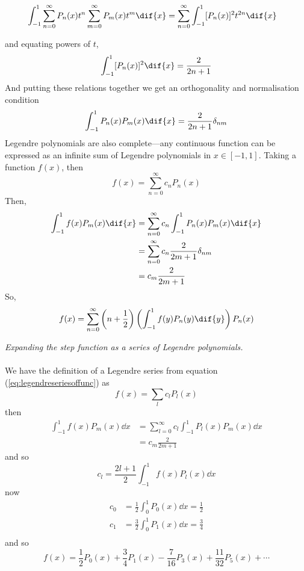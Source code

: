 \begin{align*}
  \int_{-1}^1 \sum_{n=0}^{\infty} P_n(x)t^n \sum_{m=0}^{\infty} P_m(x)
  t^m \dif{x} &= \sum_{n=0}^{\infty} \int_{-1}^1 [P_n(x)]^2 t^{2n}
  \dif{x}
\end{align*}

and equating powers of $t$,
\begin{align*}
  \int_{-1}^1 [P_n(x)]^2 \dif{x} = \frac{2}{2n + 1}
\end{align*}
And putting these relations together we get an orthogonality and
normalisation condition
\begin{equation}
  \label{eq:orthonormlegend}
  \int_{-1}^1 P_n(x) P_m(x) \dif{x} = \frac{2}{2n+1} \delta_{nm}
\end{equation}
Legendre polynomials are also complete---any continuous function can
be expressed as an infinite sum of Legendre polynomials in $x \in
[-1,1]$. Taking a function $f(x)$, then
\begin{equation}
  \label{eq:legendreseries}
  f(x) = \sum_{n=0}^{\infty} c_n P_n(x)
\end{equation}
Then,
\begin{align*}
  \int_{-1}^1 f(x) P_m(x) \dif{x} &= \sum_{n=0}^{\infty} c_n
  \int_{-1}^1 P_n(x) P_m(x) \dif{x} \\ &= \sum_{n=0}^{\infty} c_n
  \frac{2}{2m+1} \delta_{nm} \\ &= c_m \frac{2}{2m+1}
\end{align*}
So,
\begin{equation}
  \label{eq:legendreseriesoffunc}
  f(x) = \sum_{n=0}^{\infty} \left( n + \frac{1}{2} \right) \left( \int_{-1}^1 f(y) P_n(y) \dif{y} \right) P_n(x)
\end{equation}
\begin{example}
  {\em Expanding the step function as a series of Legendre polynomials.}\\
  \\
  We have the definition of a Legendre series from equation (\ref{eq:legendreseriesoffunc}) as
  \[ f(x) = \sum_l c_l P_l(x) \]
  then
  \begin{align*} 
\int_{-1}^1 f(x) P_m(x) \dd{x} &= \sum_{l=0}^{\infty} c_l \int_{-1}^1 P_l(x) P_m(x) \dd{x} \\&= c_m \frac{2}{2m+1}
\end{align*}
and so
  \[ c_l = \frac{2l+1}{2} \int_{-1}^1 f(x) P_l(x) \dd{x} \]
  now
  \begin{align*}
    c_0 &= \frac{1}{2} \int_0^1 P_0(x) \dd{x} = \frac{1}{2} \\
    c_1 &= \frac{3}{2} \int_0^1 P_1(x) \dd{x} = \frac{3}{4} \\
  \end{align*}
  and so
  \begin{equation*}
    f(x) = \frac{1}{2} P_0(x) + \frac{3}{4} P_1(x) - \frac{7}{16} P_3(x) + \frac{11}{32} P_5(x) + \cdots
  \end{equation*}
  
\end{example}

